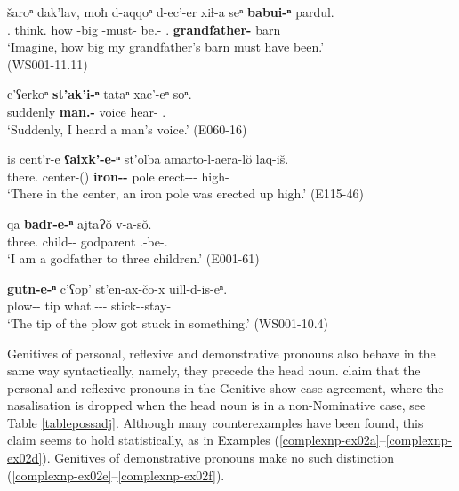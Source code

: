 \begin{exe}
	\ex\label{complexnp-ex01}
	\begin{xlist}
		
		\ex\label{complexnp-ex01a}
		\gll šaroⁿ dak'lav, moħ d-aqqoⁿ d-ec'-er xiɬ-a\textsuperscript{} seⁿ \textbf{babui-ⁿ} pardul. \\
		{\Refl}.{\Emph} think.{\Pfv} how {\D}-big {\D}-must-{\Imprf} be.{\Pfv}-{\Inf} {\Fsg}.{\Gen} \textbf{grandfather-{\Gen}} barn \\
		\trans `Imagine, how big my grandfather's barn must have been.' \\
		\hfill (WS001-11.11)
		
		
		\ex\label{complexnp-ex01b}
		\gll c'ʕerkoⁿ \textbf{st'ak'i-ⁿ} tataⁿ xac'-eⁿ soⁿ. \\
		suddenly \textbf{man.{\Obl}-{\Gen}} voice hear-{\Aor} {\Fsg}.{\Dat} \\
		\trans `Suddenly, I heard a man's voice.'
		\hfill (E060-16)
		
		\ex\label{complexnp-ex01c}
		\gll is cent'r-e \textbf{ʕaixk'-e-ⁿ} st'olba amarto-l-aera-l\u{o} laq-iš. \\
		there.{\Med} center-{\Obl}({\Ess}) \textbf{iron-{\Obl}-{\Gen}} pole erect-{\Intr}-{\Imprf}-{\Sbjv} high-{\Adv} \\
		\trans `There in the center, an iron pole was erected up high.'
		\hfill (E115-46)
		
		\ex\label{complexnp-ex01d}
		\gll qa \textbf{badr-e-ⁿ} ajtaɁ\u{o} v-a-s\u{o}.  \\
		three.{\Obl} child-{\Obl}-{\Gen} godparent {\M}.{\Sg}-be-{\Fsg}.{\Nom} \\
		\trans `I am a godfather to three children.'
		\hfill (E001-61)
		
		\ex\label{complexnp-ex01e}
		\gll \textbf{gutn-e-ⁿ} c'ʕop' st'en-ax-čo-x uill-d-is-eⁿ. \\
		plow-{\Obl}-{\Gen} tip what.{\Obl}-{\Indf}-{\Obl}-{\Cont} stick-{\D}-stay-{\Aor} \\
		\trans `The tip of the plow got stuck in something.'
		\hfill (WS001-10.4)
		
		
	\end{xlist}
\end{exe}



Genitives of personal, reflexive and demonstrative pronouns also behave in the same way syntactically, namely, they precede the head noun. \textcite{haukharris} claim that the personal and reflexive pronouns in the Genitive show case agreement, where the nasalisation is dropped when the head noun is in a non-Nominative case, see Table \ref{tablepossadj}. Although many counterexamples have been found, this claim seems to hold statistically, as in Examples (\ref{complexnp-ex02a}--\ref{complexnp-ex02d}). Genitives of demonstrative pronouns make no such distinction (\ref{complexnp-ex02e}--\ref{complexnp-ex02f}).


